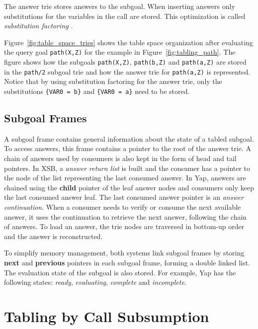The answer trie stores answers to the subgoal. When inserting answers only substitutions
for the variables in the call are stored. This optimization is called \textit{substitution factoring} \cite{RamakrishnanIV-95}.

Figure~\ref{fig:table_space_tries} shows the table space organization after evaluating the query goal
\texttt{path(X,Z)} for the example in Figure~\ref{fig:tabling_path}.
The figure shows how the subgoals \texttt{path(X,Z)}, \texttt{path(b,Z)} and \texttt{path(a,Z)} are
stored in the \texttt{path/2} subgoal trie and how the answer trie for \texttt{path(a,Z)} is represented.
Notice that by using substitution factoring for the answer trie, only the substitutions
\texttt{\{VAR0 = b\}} and \texttt{\{VAR0 = a\}} need to be stored.

\subsection{Subgoal Frames}

A subgoal frame contains general information about the state of a tabled subgoal. To access answers, this
frame contains a pointer to the root of the answer trie. A chain of answers used by consumers is also kept
in the form of head and tail pointers. In XSB, a \textit{answer return list} is built and the consumer has
a pointer to the node of the list representing the last consumed answer. In Yap, answers are chained using
the \textbf{child} pointer of the leaf answer nodes and consumers only keep the last consumed answer leaf.
The last consumed answer pointer is an \textit{answer continuation}. When a consumer needs to verify
or consume the next available answer, it uses the continuation to retrieve the next answer, following the
chain of answers. To load an answer, the trie nodes are traversed in bottom-up order and the answer is
reconstructed.

To simplify memory management, both systems link subgoal frames by storing
\textbf{next} and \textbf{previous} pointers in each subgoal frame, forming a double linked list.
The evaluation state of the subgoal is also stored. For example, Yap has the following states:
\textit{ready}, \textit{evaluating}, \textit{complete} and \textit{incomplete}.

\section{Tabling by Call Subsumption} \label{sec:subsumption}

